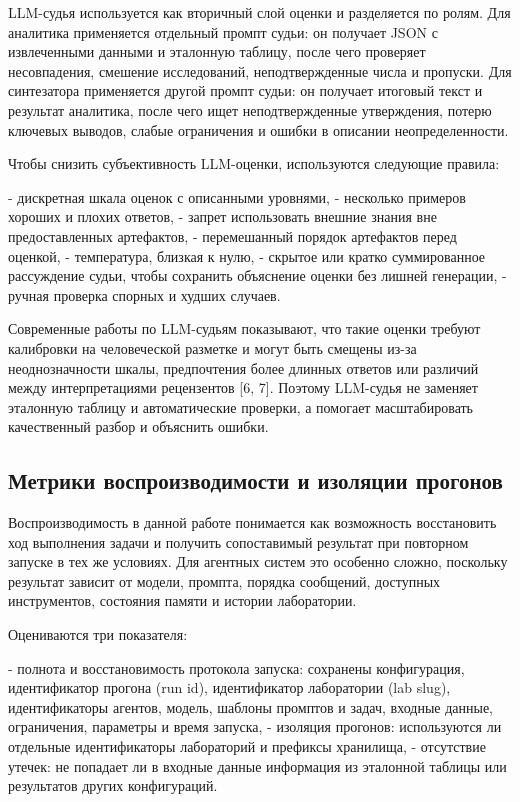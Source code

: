 LLM-судья используется как вторичный слой оценки и разделяется по ролям. Для аналитика применяется отдельный промпт судьи: он получает JSON с извлеченными данными и эталонную таблицу, после чего проверяет несовпадения, смешение исследований, неподтвержденные числа и пропуски. Для синтезатора применяется другой промпт судьи: он получает итоговый текст и результат аналитика, после чего ищет неподтвержденные утверждения, потерю ключевых выводов, слабые ограничения и ошибки в описании неопределенности.

Чтобы снизить субъективность LLM-оценки, используются следующие правила:

- дискретная шкала оценок с описанными уровнями,
- несколько примеров хороших и плохих ответов,
- запрет использовать внешние знания вне предоставленных артефактов,
- перемешанный порядок артефактов перед оценкой,
- температура, близкая к нулю,
- скрытое или кратко суммированное рассуждение судьи, чтобы сохранить объяснение оценки без лишней генерации,
- ручная проверка спорных и худших случаев.

Современные работы по LLM-судьям показывают, что такие оценки требуют калибровки на человеческой разметке и могут быть смещены из-за неоднозначности шкалы, предпочтения более длинных ответов или различий между интерпретациями рецензентов [6, 7]. Поэтому LLM-судья не заменяет эталонную таблицу и автоматические проверки, а помогает масштабировать качественный разбор и объяснить ошибки.

\subsection{Метрики воспроизводимости и изоляции прогонов}

Воспроизводимость в данной работе понимается как возможность восстановить ход выполнения задачи и получить сопоставимый результат при повторном запуске в тех же условиях. Для агентных систем это особенно сложно, поскольку результат зависит от модели, промпта, порядка сообщений, доступных инструментов, состояния памяти и истории лаборатории.

Оцениваются три показателя:

- полнота и восстановимость протокола запуска: сохранены конфигурация, идентификатор прогона (run id), идентификатор лаборатории (lab slug), идентификаторы агентов, модель, шаблоны промптов и задач, входные данные, ограничения, параметры и время запуска,
- изоляция прогонов: используются ли отдельные идентификаторы лабораторий и префиксы хранилища,
- отсутствие утечек: не попадает ли в входные данные информация из эталонной таблицы или результатов других конфигураций.

